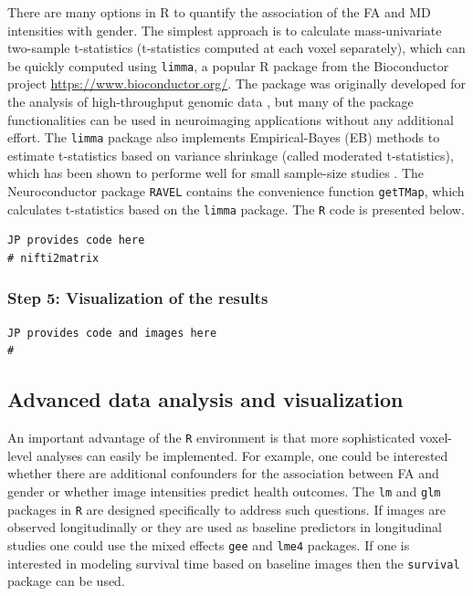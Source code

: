\documentclass[]{elsarticle} %
\begin{document}
There are many options in R to quantify the association of the FA and MD intensities with gender. The simplest approach is to calculate mass-univariate two-sample t-statistics (t-statistics computed at each voxel separately), which can be quickly computed using \texttt{limma}, a popular R package from the Bioconductor project \url{https://www.bioconductor.org/}. The package was originally developed for the analysis of high-throughput genomic data \citep{ritchie2015limma}, but many of the package functionalities can  be used in neuroimaging applications without any additional effort. The \texttt{limma} package also implements Empirical-Bayes (EB) methods to estimate  t-statistics based on variance shrinkage (called moderated t-statistics), which has been shown to performe well for small sample-size studies \citep{berkeley2004linear,ritchie2015limma}. The Neuroconductor package \texttt{RAVEL} contains the convenience function \texttt{getTMap}, which calculates t-statistics based on the \texttt{limma} package.  The \texttt{R} code is presented below.

\color{blue}
\begin{verbatim}
JP provides code here
# nifti2matrix
\end{verbatim}
\color{black}

\subsubsection{Step 5: Visualization of the results}
\color{blue}
\begin{verbatim}
JP provides code and images here
# 
\end{verbatim}
\color{black}

\subsection{Advanced data analysis and visualization}
An important advantage  of the  \texttt{R} environment  is that  more sophisticated voxel-level analyses  can easily be  implemented.  For  example, one could be interested  whether  there  are  additional confounders  for the association between  FA and gender or  whether  image intensities predict health outcomes. The \texttt{lm} and \texttt{glm} packages in \texttt{R} are designed specifically to address such questions. If images are observed longitudinally or they are used as baseline predictors in longitudinal studies one could use the mixed effects \texttt{gee} \cite{gee} and \texttt{lme4} \cite{lme4} packages. If one is interested in modeling survival time based on baseline images then the \texttt{survival} package \cite{survival-package,survival-book} can be used.
\end{document}
